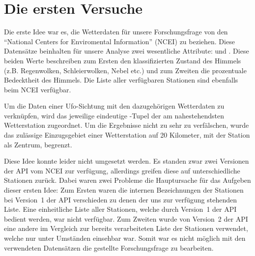 \section{Die ersten Versuche} \label{versuch1}
Die erste Idee war es, die Wetterdaten für unsere Forschungsfrage von den \enquote{National Centers for Enviromental Information} (NCEI) zu beziehen. Diese Datensätze beinhalten für unsere Analyse zwei wesentliche Attribute:  und . Diese beiden Werte beschreiben zum Ersten den klassifizierten Zustand des Himmels (z.B. Regenwolken, Schleierwolken, Nebel etc.) und zum Zweiten die prozentuale Bedecktheit des Himmels. Die Liste aller verfügbaren Stationen sind ebenfalls beim NCEI verfügbar.

Um die Daten einer Ufo-Sichtung mit den dazugehörigen Wetterdaten zu verknüpfen, wird das jeweilige eindeutige -Tupel der am nahestehendsten Wetterstation zugeordnet. Um die Ergebnisse nicht zu sehr zu verfälschen, wurde das zulässige Einzugsgebiet einer Wetterstation auf 20 Kilometer, mit der Station als Zentrum, begrenzt.

Diese Idee konnte leider nicht umgesetzt werden. Es standen zwar zwei Versionen der API vom NCEI zur verfügung, allerdings greifen diese auf unterschiedliche Stationen zurück. Dabei waren zwei Probleme die Hauptursache für das Aufgeben dieser ersten Idee: Zum Ersten waren die internen Bezeichnungen der Stationen bei Version~1 der API verschieden zu denen der uns zur verfügung stehenden Liste\cite{v1:2021}. Eine einheitliche Liste aller Stationen, welche durch Version~1 der API bedient werden, war nicht verfügbar. Zum Zweiten wurde von Version~2 der API eine andere im Vergleich zur bereits verarbeiteten Liste der Stationen verwendet, welche nur unter Umständen einsehbar war\cite{v2:2021}. Somit war es nicht möglich mit den verwendeten Datensätzen die gestellte Forschungsfrage zu bearbeiten.